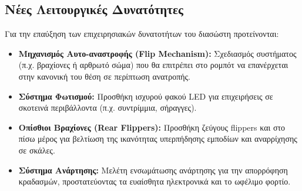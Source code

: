 \subsection{Νέες Λειτουργικές Δυνατότητες}
Για την επαύξηση των επιχειρησιακών δυνατοτήτων του διασώστη προτείνονται:
\begin{itemize}
    \item \textbf{Μηχανισμός Αυτο-αναστροφής (Flip Mechanism):} Σχεδιασμός συστήματος (π.χ. βραχίονες ή αρθρωτό σώμα) που θα επιτρέπει στο ρομπότ να επανέρχεται στην κανονική του θέση σε περίπτωση ανατροπής.
    \item \textbf{Σύστημα Φωτισμού:} Προσθήκη ισχυρού φακού LED για επιχειρήσεις σε σκοτεινά περιβάλλοντα (π.χ. συντρίμμια, σήραγγες).
    \item \textbf{Οπίσθιοι Βραχίονες (Rear Flippers):} Προσθήκη ζεύγους flippers και στο πίσω μέρος για βελτίωση της ικανότητας υπερπήδησης εμποδίων και αναρρίχησης σε σκάλες.
    \item \textbf{Σύστημα Ανάρτησης:} Μελέτη ενσωμάτωσης ανάρτησης για την απορρόφηση κραδασμών, προστατεύοντας τα ευαίσθητα ηλεκτρονικά και το ωφέλιμο φορτίο.
\end{itemize}

